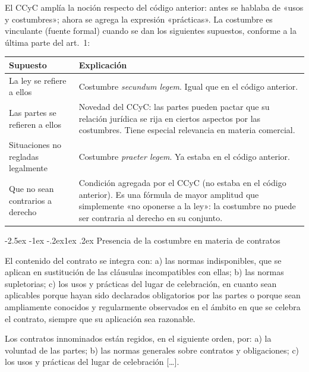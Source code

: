 \documentclass[12pt,oneside]{book}
\makeatletter
\renewcommand\subsection{\@startsection{subsection}{2}{\z@}%
  {-2.5ex \@plus -1ex \@minus -.2ex}{1ex \@plus .2ex}%
  {\normalfont\normalsize\bfseries}}
\makeatother
\begin{document}
El CCyC amplía la noción respecto del código anterior: antes se hablaba de «usos y costumbres»; ahora se agrega la expresión «prácticas». La costumbre es vinculante (fuente formal) cuando se dan los siguientes supuestos, conforme a la última parte del art.~1:

\begin{table}[H]
\centering
\begin{tabularx}{\textwidth}{>{\raggedright\arraybackslash}p{} >{\raggedright\arraybackslash}X}
\toprule
\textbf{Supuesto} & \textbf{Explicación} \\
\midrule
La ley se refiere a ellos & Costumbre \textit{secundum legem}. Igual que en el código anterior. \\
\addlinespace
Las partes se refieren a ellos & Novedad del CCyC: las partes pueden pactar que su relación jurídica se rija en ciertos aspectos por las costumbres. Tiene especial relevancia en materia comercial. \\
\addlinespace
Situaciones no regladas legalmente & Costumbre \textit{praeter legem}. Ya estaba en el código anterior. \\
\addlinespace
Que no sean contrarios a derecho & Condición agregada por el CCyC (no estaba en el código anterior). Es una fórmula de mayor amplitud que simplemente «no oponerse a la ley»: la costumbre no puede ser contraria al derecho en su conjunto. \\
\bottomrule
\end{tabularx}
\end{table}

\subsection{Presencia de la costumbre en materia de contratos}

\begin{regla}
El contenido del contrato se integra con: a) las normas indisponibles, que se aplican en sustitución de las cláusulas incompatibles con ellas; b) las normas supletorias; c) los usos y prácticas del lugar de celebración, en cuanto sean aplicables porque hayan sido declarados obligatorios por las partes o porque sean ampliamente conocidos y regularmente observados en el ámbito en que se celebra el contrato, siempre que su aplicación sea razonable.
\end{regla}

\begin{regla}
Los contratos innominados están regidos, en el siguiente orden, por: a) la voluntad de las partes; b) las normas generales sobre contratos y obligaciones; c) los usos y prácticas del lugar de celebración [\ldots].
\end{regla}
\end{document}
